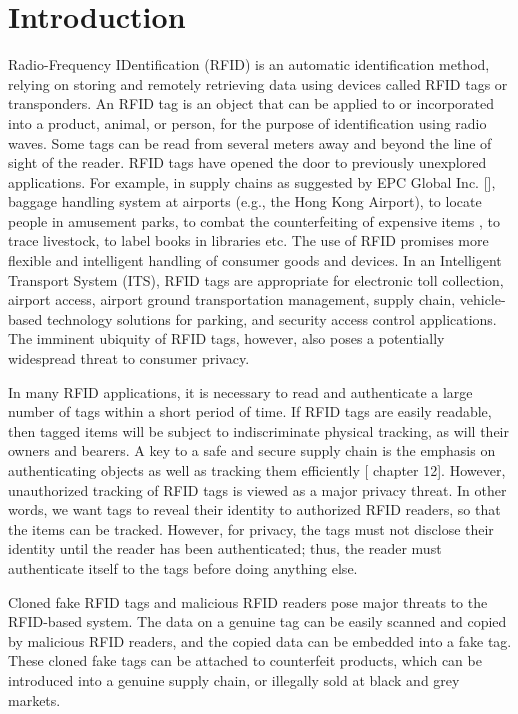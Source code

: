 \documentclass{easychair}
\begin{document}
\section{Introduction}

Radio-Frequency IDentification (RFID) is an automatic
identification method, relying on storing and remotely retrieving
data using devices called RFID tags or transponders. An
RFID tag is an object that can be applied to or incorporated
into a product, animal, or person, for the purpose of identification
using radio waves. Some tags can be read from
several meters away and beyond the line of sight of the reader.
RFID tags have opened the door to previously unexplored
applications. For example, in supply chains as suggested by EPC Global Inc. [\cite{EPC, juels}], baggage handling 
system at airports (e.g.,
the Hong Kong Airport), to locate people in amusement parks,
to combat the counterfeiting of expensive items \cite{JuelsPappu}, to trace 
livestock, to label books in libraries \cite{MolnerWagner} etc.
The use of RFID promises more flexible and intelligent handling of
consumer goods and devices. In an Intelligent Transport System (ITS), RFID tags are appropriate for electronic toll 
collection, airport access, airport ground transportation management, supply chain, vehicle-based technology solutions 
for parking, and security access control applications. The imminent ubiquity
of RFID tags, however, also poses a potentially widespread
threat to consumer privacy. 

In many RFID applications, it is necessary to read and
authenticate a large number of tags within a short period of
time. If RFID tags are easily readable, then tagged items will be subject to indiscriminate physical
tracking, as will their owners and bearers. A key to a safe and secure supply chain is the emphasis on
authenticating objects as well as tracking them efficiently
[\cite{AutoID} chapter 12]. However, unauthorized tracking of RFID tags is
viewed as a major privacy threat. In other words, we want tags to
reveal their identity to authorized RFID readers, so that the items can be tracked. However, for privacy, the
tags must not disclose their identity until the reader has been
authenticated; thus, the reader must authenticate itself to
the tags before doing anything else.

Cloned fake RFID tags and
malicious RFID readers pose major threats to the RFID-based system. The data on a genuine tag
can be easily scanned and copied by malicious RFID readers, and the copied data can be embedded into a fake tag. These
cloned fake tags can be attached to counterfeit products, which
can be introduced into a genuine supply chain, or illegally sold
at black and grey markets. 
\end{document}
